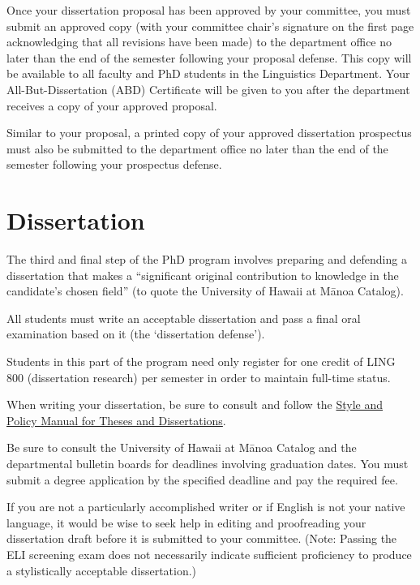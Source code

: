 \documentclass[
]{book}
\begin{document}
Once your dissertation proposal has been approved by your committee, you must submit an approved copy (with your committee chair's signature on the first page acknowledging that all revisions have been made) to the department office no later than the end of the semester following your proposal defense. This copy will be available to all faculty and PhD students in the Linguistics Department. Your All-But-Dissertation (ABD) Certificate will be given to you after the department receives a copy of your approved proposal.

Similar to your proposal, a printed copy of your approved dissertation prospectus must also be submitted to the department office no later than the end of the semester following your prospectus defense.

\chapter{Dissertation}\label{dissertation}

The third and final step of the PhD program involves preparing and defending a dissertation that makes a ``significant original contribution to knowledge in the candidate's chosen field'' (to quote the University of Hawai\textquotesingle i at Mānoa Catalog).

All students must write an acceptable dissertation and pass a final oral examination based on it (the `dissertation defense').

Students in this part of the program need only register for one credit of LING 800 (dissertation research) per semester in order to maintain full-time status.

When writing your dissertation, be sure to consult and follow the \href{http://manoa.hawaii.edu/graduate/sites/manoa.hawaii.edu.graduate/files/documents/misc/tdstylepolicy_e.pdf}{Style and Policy Manual for Theses and Dissertations}.

Be sure to consult the University of Hawai\textquotesingle i at Mānoa Catalog and the departmental bulletin boards for deadlines involving graduation dates. You must submit a degree application by the specified deadline and pay the required fee.

If you are not a particularly accomplished writer or if English is not your native language, it would be wise to seek help in editing and proofreading your dissertation draft before it is submitted to your committee. (Note: Passing the ELI screening exam does not necessarily indicate sufficient proficiency to produce a stylistically acceptable dissertation.)
\end{document}
